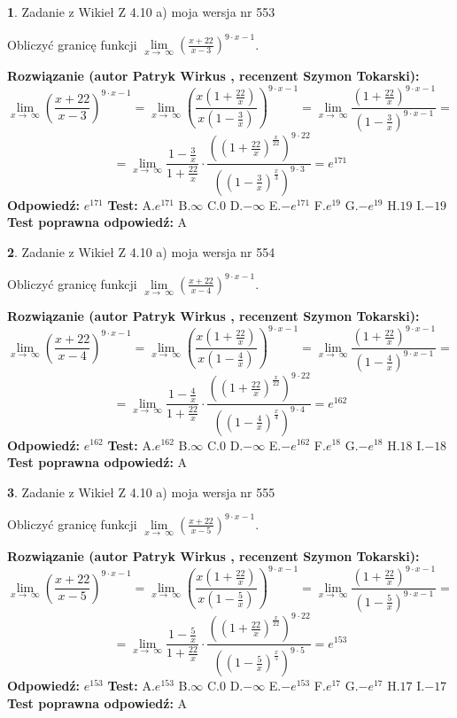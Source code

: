 \documentclass[12pt, a4paper]{article}
\theoremstyle{definition} %
\newtheorem{zad}{}
\newcommand{\zadStart}[1]{\begin{zad}#1\newline}
\newcommand{\zadStop}{\end{zad}}
\newcommand{\rozwStart}[2]{\noindent \textbf{Rozwiązanie (autor #1 , recenzent #2): }\newline}
\newcommand{\rozwStop}{\newline}
\newcommand{\odpStart}{\noindent \textbf{Odpowiedź:}\newline}
\newcommand{\odpStop}{\newline}
\newcommand{\testStart}{\noindent \textbf{Test:}\newline}
\newcommand{\testStop}{\newline}
\newcommand{\kluczStart}{\noindent \textbf{Test poprawna odpowiedź:}\newline}
\newcommand{\kluczStop}{\newline}
\begin{document}
\zadStart{Zadanie z Wikieł Z 4.10 a) moja wersja nr 553}

Obliczyć granicę funkcji  $\lim\limits_{x\to\ \infty}(\frac{x+22}{x-3})^{9\cdot x-1}$.
\zadStop
\rozwStart{Patryk Wirkus}{Szymon Tokarski}
$$\lim\limits_{x\to\ \infty}(\frac{x+22}{x-3})^{9\cdot x-1} = \lim\limits_{x\to\ \infty}(\frac{x(1+\frac{22}{x})}{x(1-\frac{3}{x})})^{9\cdot x-1}=\lim\limits_{x\to\ \infty}\frac{(1+\frac{22}{x})^{9\cdot x-1}}{(1-\frac{3}{x})^{9\cdot x-1}}=$$
$$=\lim\limits_{x\to\ \infty}\frac{1-\frac{3}{x}}{1+\frac{22}{x}}\cdot\frac{((1+\frac{22}{x})^{\frac{x}{22}})^{9\cdot22}}{((1-\frac{3}{x})^{\frac{x}{3}})^{9\cdot3}}=e^{171}$$
\rozwStop
\odpStart
$e^{171}$
\odpStop
\testStart
A.$e^{171}$ B.$\infty$ C.$0$ D.$-\infty$ E.$-e^{171}$
F.$e^{19}$ G.$-e^{19}$
H.$19$
I.$-19$
\testStop
\kluczStart
A
\kluczStop



\zadStart{Zadanie z Wikieł Z 4.10 a) moja wersja nr 554}

Obliczyć granicę funkcji  $\lim\limits_{x\to\ \infty}(\frac{x+22}{x-4})^{9\cdot x-1}$.
\zadStop
\rozwStart{Patryk Wirkus}{Szymon Tokarski}
$$\lim\limits_{x\to\ \infty}(\frac{x+22}{x-4})^{9\cdot x-1} = \lim\limits_{x\to\ \infty}(\frac{x(1+\frac{22}{x})}{x(1-\frac{4}{x})})^{9\cdot x-1}=\lim\limits_{x\to\ \infty}\frac{(1+\frac{22}{x})^{9\cdot x-1}}{(1-\frac{4}{x})^{9\cdot x-1}}=$$
$$=\lim\limits_{x\to\ \infty}\frac{1-\frac{4}{x}}{1+\frac{22}{x}}\cdot\frac{((1+\frac{22}{x})^{\frac{x}{22}})^{9\cdot22}}{((1-\frac{4}{x})^{\frac{x}{4}})^{9\cdot4}}=e^{162}$$
\rozwStop
\odpStart
$e^{162}$
\odpStop
\testStart
A.$e^{162}$ B.$\infty$ C.$0$ D.$-\infty$ E.$-e^{162}$
F.$e^{18}$ G.$-e^{18}$
H.$18$
I.$-18$
\testStop
\kluczStart
A
\kluczStop



\zadStart{Zadanie z Wikieł Z 4.10 a) moja wersja nr 555}

Obliczyć granicę funkcji  $\lim\limits_{x\to\ \infty}(\frac{x+22}{x-5})^{9\cdot x-1}$.
\zadStop
\rozwStart{Patryk Wirkus}{Szymon Tokarski}
$$\lim\limits_{x\to\ \infty}(\frac{x+22}{x-5})^{9\cdot x-1} = \lim\limits_{x\to\ \infty}(\frac{x(1+\frac{22}{x})}{x(1-\frac{5}{x})})^{9\cdot x-1}=\lim\limits_{x\to\ \infty}\frac{(1+\frac{22}{x})^{9\cdot x-1}}{(1-\frac{5}{x})^{9\cdot x-1}}=$$
$$=\lim\limits_{x\to\ \infty}\frac{1-\frac{5}{x}}{1+\frac{22}{x}}\cdot\frac{((1+\frac{22}{x})^{\frac{x}{22}})^{9\cdot22}}{((1-\frac{5}{x})^{\frac{x}{5}})^{9\cdot5}}=e^{153}$$
\rozwStop
\odpStart
$e^{153}$
\odpStop
\testStart
A.$e^{153}$ B.$\infty$ C.$0$ D.$-\infty$ E.$-e^{153}$
F.$e^{17}$ G.$-e^{17}$
H.$17$
I.$-17$
\testStop
\kluczStart
A
\kluczStop
\end{document}
